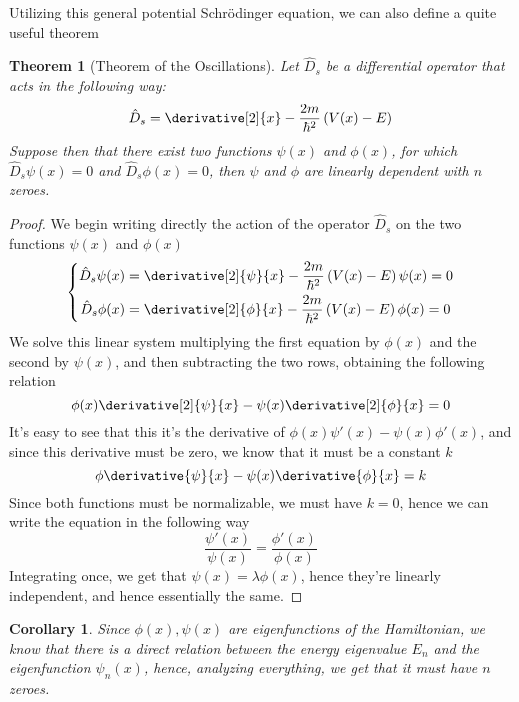 \documentclass[a4paper, 11pt]{book}
\newcommand{\1}{\opr{\mathds{1}}}
\newcommand{\opr}[1]{\hat{#1}}
\newtheorem{thm}{Theorem}
\theoremstyle{plain}
\newtheorem{cor}{Corollary}
\begin{document}
	Utilizing this general potential Schrödinger equation, we can also define a quite useful theorem
	\begin{thm}[Theorem of the Oscillations]
		Let $\opr{D}_s$ be a differential operator that acts in the following way:
		\begin{equation*}
			\opr{D}_s=\derivative[2]{x}-\frac{2m}{\hbar^2}\left( V(x)-E \right)
		\end{equation*}
		Suppose then that there exist two functions $\psi(x)$ and $\phi(x)$, for which $\opr{D}_s\psi(x)=0$ and $\opr{D}_s\phi(x)=0$, then $\psi$ and $\phi$ are linearly dependent with $n$ zeroes.
	\end{thm}
	\begin{proof}
		We begin writing directly the action of the operator $\opr{D}_s$ on the two functions $\psi(x)$ and $\phi(x)$
		\begin{equation*}
			\left\{ \begin{aligned}
					\opr{D}_s\psi(x)&=\derivative[2]{\psi}{x}-\frac{2m}{\hbar^2}\left( V(x)-E \right)\psi(x)=0\\
					\opr{D}_s\phi(x)&=\derivative[2]{\phi}{x}-\frac{2m}{\hbar^2}\left( V(x)-E \right)\phi(x)=0
			\end{aligned}\right.
		\end{equation*}
		We solve this linear system multiplying the first equation by $\phi(x)$ and the second by $\psi(x)$, and then subtracting the two rows, obtaining the following relation
		\begin{equation*}
			\phi(x)\derivative[2]{\psi}{x}-\psi(x)\derivative[2]{\phi}{x}=0
		\end{equation*}
		It's easy to see that this it's the derivative of $\phi(x)\psi'(x)-\psi(x)\phi'(x)$, and since this derivative must be zero, we know that it must be a constant $k$
		\begin{equation*}
			\phi\derivative{\psi}{x}-\psi(x)\derivative{\phi}{x}=k
		\end{equation*}
		Since both functions must be normalizable, we must have $k=0$, hence we can write the equation in the following way
		\begin{equation*}
			\frac{\psi'(x)}{\psi(x)}=\frac{\phi'(x)}{\phi(x)}
		\end{equation*}
		Integrating once, we get that $\psi(x)=\lambda\phi(x)$, hence they're linearly independent, and hence essentially the same.
	\end{proof}
	\begin{cor}
		Since $\phi(x),\psi(x)$ are eigenfunctions of the Hamiltonian, we know that there is a direct relation between the energy eigenvalue $E_n$ and the eigenfunction $\psi_{n}(x)$, hence, analyzing everything, we get that it must have $n$ zeroes.
	\end{cor}
\end{document}
